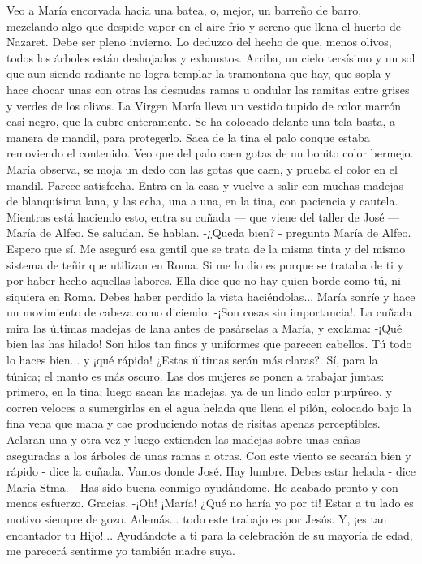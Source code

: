 \documentclass[12pt]{book} %
\begin{document}
 
 Veo a María encorvada hacia una batea, o, mejor, un barreño de barro, mezclando algo que despide vapor en el aire frío y sereno que llena el huerto de Nazaret. 
Debe ser pleno invierno. Lo deduzco del hecho de que, menos olivos, todos los árboles están deshojados y exhaustos. Arriba, un cielo tersísimo y un sol que aun siendo radiante no logra templar la tramontana que hay, que sopla y hace chocar unas con otras las desnudas ramas u ondular las ramitas entre grises y verdes de los olivos. 
La Virgen María lleva un vestido tupido de color marrón casi negro, que la cubre enteramente. Se ha colocado delante una tela basta, a manera de mandil, para protegerlo. Saca de la tina el palo conque estaba removiendo el contenido. Veo que del palo caen gotas de un bonito color bermejo. María observa, se moja un dedo con las gotas que caen, y prueba el color en el mandil. Parece satisfecha. 
Entra en la casa y vuelve a salir con muchas madejas de blanquísima lana, y las echa, una a una, en la tina, con paciencia 
y cautela. 
Mientras está haciendo esto, entra su cuñada — que viene del taller de José — María de Alfeo. Se saludan. Se hablan. -¿Queda bien? - pregunta María de Alfeo. 
Espero que sí. 
Me aseguró esa gentil que se trata de la misma tinta y del mismo sistema de teñir que utilizan en Roma. Si me lo dio es porque se trataba de ti y por haber hecho aquellas labores. Ella dice que no hay quien borde como tú, ni siquiera en Roma. Debes haber perdido la vista haciéndolas... 
María sonríe y hace un movimiento de cabeza como diciendo: 
-¡Son cosas sin importancia!. 
La cuñada mira las últimas madejas de lana antes de pasárselas a María, y exclama: 
-¡Qué bien las has hilado! Son hilos tan finos y uniformes que parecen cabellos. Tú todo lo haces bien... y ¡qué rápida! 
¿Estas últimas serán más claras?. 
Sí, para la túnica; el manto es más oscuro. 
Las dos mujeres se ponen a trabajar juntas: primero, en la tina; luego sacan las madejas, ya de un lindo color purpúreo, 
y corren veloces a sumergirlas en el agua helada que llena el pilón, colocado bajo la fina vena que mana y cae produciendo notas de risitas apenas perceptibles. Aclaran una y otra vez y luego extienden las madejas sobre unas cañas aseguradas a los árboles de unas ramas a otras. 
Con este viento se secarán bien y rápido - dice la cuñada. 
Vamos donde José. Hay lumbre. Debes estar helada - dice María Stma. - Has sido buena conmigo ayudándome. He acabado pronto y con menos esfuerzo. Gracias. 
-¡Oh! ¡María! ¿Qué no haría yo por ti! Estar a tu lado es motivo siempre de gozo. Además... todo este trabajo es por Jesús. Y, ¡es tan encantador tu Hijo!... Ayudándote a ti para la celebración de su mayoría de edad, me parecerá sentirme yo también madre suya. 
\end{document}
